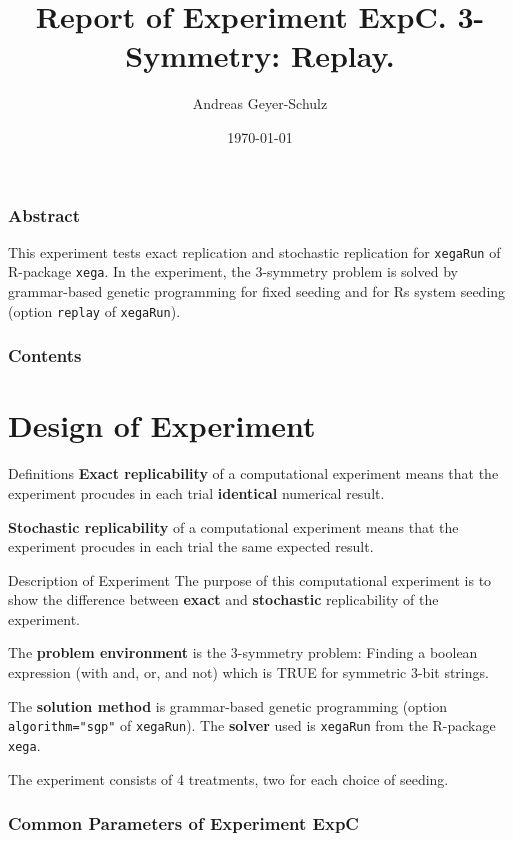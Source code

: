 \documentclass[18pt,c]{beamer}
\makeatletter
\let\beamer@writeslidentry@miniframeson=\beamer@writeslidentry
\newcommand*{\miniframeson}{\let\beamer@writeslidentry=\beamer@writeslidentry@miniframeson}
\makeatother
\begin{document}
\title{Report of Experiment ExpC. 3-Symmetry: Replay. }
\author{Andreas Geyer-Schulz}
\date{\today}
\begin{frame}
\titlepage
\end{frame}
\begin{frame}
\frametitle{Abstract}
This experiment tests exact replication and stochastic replication
for {\tt xegaRun} of R-package {\tt xega}.
In the experiment, the 3-symmetry problem is solved
by grammar-based genetic programming for fixed seeding and for
Rs system seeding (option {\tt replay} of {\tt xegaRun}).%
\end{frame}
\begin{frame}[t, allowframebreaks]
\frametitle{Contents}
\tableofcontents[subsubsectionstyle=hide]
\vfill
\end{frame}
\miniframeson
\section{Design of Experiment}
\begin{frame}
\vspace*{2mm}
\begin{block}{
Definitions
}
{\bf Exact replicability} of a computational experiment means
that the experiment procudes in each trial {\bf identical}
numerical result.
 
{\bf Stochastic replicability} of a computational experiment means
that the experiment procudes in each trial the same 
expected result.
\end{block}
\end{frame}%
\begin{frame}
\vspace*{2mm}
\begin{block}{
Description of Experiment
}
The purpose of this computational experiment is to show the difference
between {\bf exact} and {\bf stochastic} replicability of the experiment.
 
The {\bf problem environment} is the 3-symmetry problem: 
Finding a boolean expression (with and, or, and not)
which is TRUE for symmetric 3-bit strings.
 
The {\bf solution method} is grammar-based genetic programming
(option {\tt algorithm="sgp"}  of {\tt xegaRun}).
The {\bf solver} used is {\tt xegaRun} from the R-package {\tt xega}.
 
The experiment consists of 4 treatments, two for each choice of seeding.
\end{block}
\end{frame}%
 \begin{frame}
 \fontsize{8pt}{9pt}\selectfont
 \frametitle{ Common Parameters of Experiment ExpC }

 \label{ExpCCommonTable000.tex}  
 \end{frame}
\end{document}
